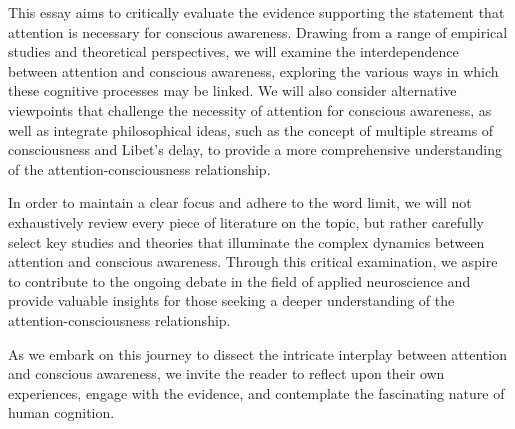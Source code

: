 \documentclass[10pt]{article}
\begin{document}
\begin{sloppypar}
  This essay aims to critically evaluate the evidence supporting the statement that attention is necessary for conscious awareness. Drawing from a range of empirical studies and theoretical perspectives, we will examine the interdependence between attention and conscious awareness, exploring the various ways in which these cognitive processes may be linked. We will also consider alternative viewpoints that challenge the necessity of attention for conscious awareness, as well as integrate philosophical ideas, such as the concept of multiple streams of consciousness and Libet’s delay, to provide a more comprehensive understanding of the attention-consciousness relationship.

  In order to maintain a clear focus and adhere to the word limit, we will not exhaustively review every piece of literature on the topic, but rather carefully select key studies and theories that illuminate the complex dynamics between attention and conscious awareness. Through this critical examination, we aspire to contribute to the ongoing debate in the field of applied neuroscience and provide valuable insights for those seeking a deeper understanding of the attention-consciousness relationship.

  As we embark on this journey to dissect the intricate interplay between attention and conscious awareness, we invite the reader to reflect upon their own experiences, engage with the evidence, and contemplate the fascinating nature of human cognition.

  \pagebreak
  \singlespacing %
  
  

\end{sloppypar}
\end{document}
